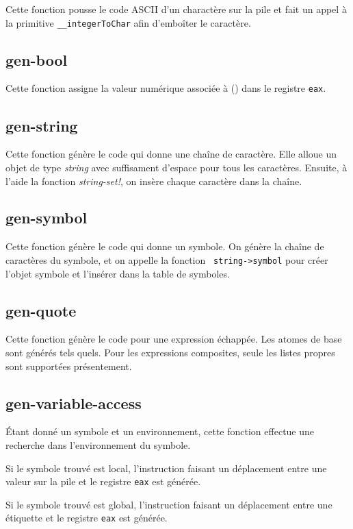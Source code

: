 \documentclass[11pt]{report}
\begin{document}
Cette fonction pousse le code ASCII d'un charactère sur la pile et
fait un appel à la primitive {\tt __integerToChar} afin d'emboîter le
caractère.

\subsection{gen-bool}

Cette fonction assigne la valeur numérique associée à () dans le
registre {\tt eax}.

\subsection{gen-string}

Cette fonction génère le code qui donne une chaîne de caractère.  Elle
alloue un objet de type {\it string} avec suffisament d'espace pour
tous les caractères.  Ensuite, à l'aide la fonction {\it string-set!},
on insère chaque caractère dans la chaîne.

\subsection{gen-symbol}

Cette fonction génère le code qui donne un symbole.  On génère la
chaîne de caractères du symbole, et on appelle la fonction {\tt
  string->symbol} pour créer l'objet symbole et l'insérer dans la
table de symboles.

\subsection{gen-quote}

Cette fonction génère le code pour une expression échappée. Les atomes
de base sont générés tels quels. Pour les expressions composites,
seule les listes propres sont supportées présentement.

\subsection{gen-variable-access}

Étant donné un symbole et un environnement, cette fonction effectue
une recherche dans l'environnement du symbole.

Si le symbole trouvé est local, l'instruction faisant un déplacement
entre une valeur sur la pile et le registre {\tt eax} est générée.

Si le symbole trouvé est global, l'instruction faisant un déplacement
entre une étiquette et le registre {\tt eax} est générée.
\end{document}
